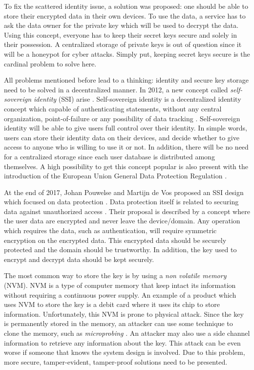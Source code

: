 To fix the scattered identity issue, a solution was proposed: one should be able to store their encrypted data in their own devices. To use the data, a service has to ask the data owner for the private key which will be used to decrypt the data. Using this concept, everyone has to keep their secret keys secure and solely in their possession.
A centralized storage of private keys is out of question since it will be a honeypot for cyber attacks. Simply put, keeping secret keys secure is the cardinal problem to solve here.


All problems mentioned before lead to a thinking: identity and secure key storage need to be solved in a decentralized manner.
In 2012, a new concept called \textit{self-sovereign identity} (SSI) arise \cite{moxytongue}.
Self-sovereign identity is a decentralized identity concept which capable of authenticating statements, without any central organization, point-of-failure or any possibility of data tracking \cite{pouwelse}. Self-sovereign identity will be able to give users full control over their identity. In simple words, users can store their identity data on their devices, and decide whether to give access to anyone who is willing to use it or not. In addition, there will be no need for a centralized storage since each user database is distributed among themselves. A high possibility to get this concept popular is also present with the introduction of the European Union General Data Protection Regulation \cite{eur-lex}.

At the end of 2017, Johan Pouwelse and Martijn de Vos proposed an SSI design which focused on data protection \cite{pouwelse}.
Data protection itself is related to securing data against unauthorized access \cite{data_protection_scheme}.
Their proposal is described by a concept where the user data are encrypted and never leave the device/domain. Any operation which requires the data, such as authentication, will require symmetric encryption on the encrypted data. This encrypted data should be securely protected and the domain should be trustworthy. In addition, the key used to encrypt and decrypt data should be kept securely.

The most common way to store the key is by using a \textit{non volatile memory} (NVM). NVM is a type of computer memory that keep intact its information without requiring a continuous power supply. An example of a product which uses NVM to store the key is a debit card where it uses its chip to store information. Unfortunately, this NVM is prone to physical attack. Since the key is permanently stored in the memory, an attacker can use some technique to clone the memory, such as \textit{microprobing} \cite{skorobogatov_2011}.  An attacker may also use a side channel information to retrieve any information about the key.
This attack can be even worse if someone that knows the system design is involved. Due to this problem, more secure, tamper-evident, tamper-proof solutions need to be presented.

